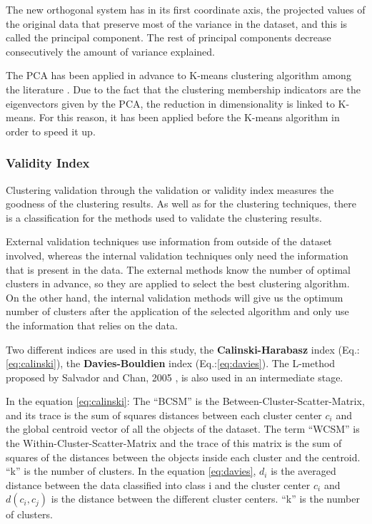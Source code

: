 The new orthogonal system has in its first coordinate axis, the projected values of the original data that preserve most of the variance in the dataset, and this is called the principal component. The rest of principal components decrease consecutively the amount of variance explained.

The PCA has been applied in advance to K-means clustering algorithm among the literature \cite*{Ding2004}. Due to the fact that the clustering membership indicators are the eigenvectors given by the PCA, the reduction in dimensionality is linked to K-means. For this reason, it has been applied before the K-means algorithm in order to speed it up.

\subsubsection{Validity Index}

Clustering validation through the validation or validity index measures the goodness of the clustering results. As well as for the clustering techniques, there is a classification for the methods used to validate the clustering results.

External validation techniques use information from outside of the dataset involved, whereas the internal validation techniques only need the information that is present in the data. The external methods know the number of optimal clusters in advance, so they are applied to select the best clustering algorithm. On the other hand, the internal validation methods will give us the optimum number of clusters after the application of the selected algorithm and only use the information that relies on the data.

Two different indices are used in this study, the \textbf{Calinski-Harabasz} index (Eq.:\ref{eq:calinski}), the \textbf{Davies-Bouldien} index (Eq.:\ref{eq:davies}). The L-method proposed by Salvador and Chan, 2005 \cite*{CalinskiH, davies1979cluster, Salvador2004}, is also used in an intermediate stage.

In the equation \ref{eq:calinski}: The ``BCSM'' is the Between-Cluster-Scatter-Matrix, and its trace is the sum of squares distances between each cluster center $c_{i}$ and the global centroid vector of all the objects of the dataset. The term ``WCSM'' is the Within-Cluster-Scatter-Matrix and the trace of this matrix is the sum of squares of the distances between the objects inside each cluster and the centroid. ``k'' is the number of clusters. In the equation \ref{eq:davies}, $d_{i}$ is the averaged distance between the data classified into class i and the cluster center $c_{i}$ and $d(c_i,c_j)$ is the distance between the different cluster centers. ``k'' is the number of clusters. 

